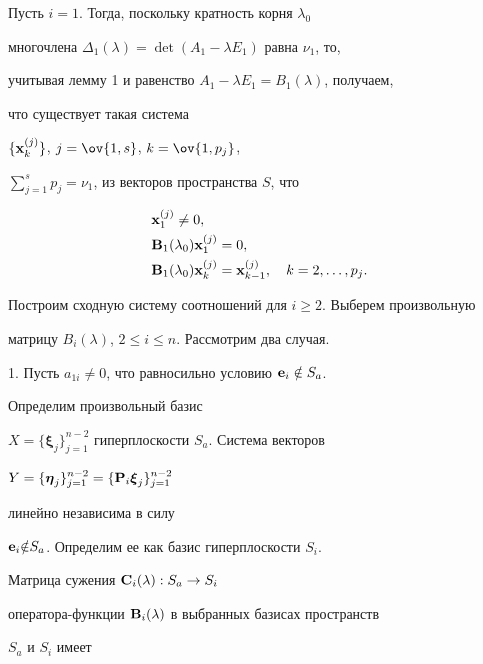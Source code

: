 \begin{pf} 


Пусть $i=1$. Тогда, поскольку кратность корня $\lambda_0$ 


многочлена $\Delta_1(\lambda)=\det(A_1-\lambda E_1)$ равна $\nu_1$, то, 


учитывая лемму 1 и равенство $A_1-\lambda E_1=B_1(\lambda)$, получаем, 


что существует такая система


$\{\bold x^{(j)}_k\}$, $j=\ov{1,s}$, $k=\ov{1,p_j}$, 


$\sum\limits^s_{j=1}p_j=\nu_1$, из векторов пространства $S$, что 


\begin{align*} 


& \bold x^{(j)}_1\ne 0,\\ 


& \bold B_1(\lambda_0)\bold x^{(j)}_1=0,\\ 


& \bold B_1(\lambda_0)\bold x^{(j)}_k=\bold x^{(j)}_{k-1}, 


\quad k=2,\dotsc,p_j. 


\end{align*} 


 


Построим сходную систему соотношений для $i\ge2$. Выберем произвольную 


матрицу $B_i(\lambda)$, $2\le i\le n$. Рассмотрим два случая. 


\smallskip 


 


1. Пусть $a_{1i}\ne0$, что равносильно условию $\bold e_i\notin S_a$. 


Определим произвольный базис 


$X=\{\boldsymbol\xi_j\}^{n-2}_{j=1}$ гиперплоскости $S_a$. Система векторов 


$Y=\{\boldsymbol\eta_j\}^{n-2}_{j=1}=


\{\bold P_i\boldsymbol\xi_j\}^{n-2}_{j=1}$


линейно независима в силу 


$\bold e_i{\notin} S_a$. Определим ее как базис гиперплоскости $S_i$. 


Матрица сужения $\bold C_i(\lambda):S_a\to S_i$ 


оператора-функции $\bold B_i(\lambda)$ в выбранных базисах пространств 


$S_a$ и $S_i$ имеет 



\end{pf}
